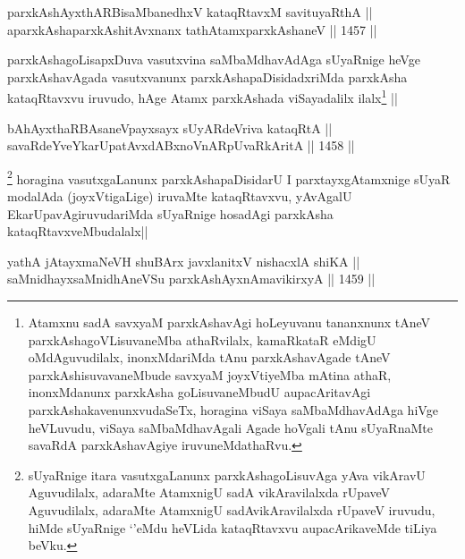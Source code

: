 
\begin{shl}
parxkAshAyxthARBisaMbanedhxV kataqRtavxM savituyaRthA ||  \\
aparxkAshaparxkAshitAvxnanx tathA\s \s tamxparxkAshaneV ||  1457 ||  
\end{shl}

\begin{artha}
parxkAshagoLisapxDuva vasutxvina saMbaMdhavAdAga sUyaRnige heVge parxkAshavAgada vasutxvanunx parxkAshapaDisidadxriMda parxkAsha kataqRtavxvu iruvudo, hAge Atamx parxkAshada viSayadalilx ilalx\footnote{Atamxnu sadA savxyaM parxkAshavAgi hoLeyuvanu tananxnunx tAneV parxkAshagoVLisuvaneMba athaRvilalx, kamaRkataR eMdigU oMdAguvudilalx, inonxMdariMda tAnu parxkAshavAgade tAneV parxkAshisuvavaneMbude savxyaM joyxVtiyeMba mAtina athaR, inonxMdanunx parxkAsha goLisuvaneMbudU aupacAritavAgi parxkAshakavenunxvudaSeTx, horagina viSaya saMbaMdhavAdAga hiVge heVLuvudu, viSaya saMbaMdhavAgali Agade hoVgali tAnu sUyaRnaMte savaRdA parxkAshavAgiye iruvuneMdathaRvu.} ||
\end{artha}

\begin{shl}
bAhAyxthaRBAsaneV\s payxsayx sUyARdeVriva kataqRtA || \\
savaRdeYveYkarUpatAvxdABxnoVnARpUvaRkAritA ||  1458 ||  
\end{shl}

\begin{artha}
\footnote{sUyaRnige itara vasutxgaLanunx parxkAshagoLisuvAga yAva vikAravU Aguvudilalx, adaraMte AtamxnigU sadA vikAravilalxda rUpaveV Aguvudilalx, adaraMte AtamxnigU sadAvikAravilalxda rUpaveV iruvudu, hiMde sUyaRnige `\stext'eMdu heVLida kataqRtavxvu aupacArikaveMde tiLiya beVku.}
horagina vasutxgaLanunx parxkAshapaDisidarU I parxtayxgAtamxnige sUyaR modalAda (joyxVtigaLige) iruvaMte kataqRtavxvu, yAvAgalU EkarUpavAgiruvudariMda sUyaRnige hosadAgi parxkAsha kataqRtavxveMbudalalx||
\end{artha}


\begin{shl}
yathA jAtayxmaNeVH shuBArx javxlanitxV nishacxlA shiKA || \\
saMnidhayxsaMnidhAneVSu parxkAshAyxnAmavikirxyA ||  1459 ||  
\end{shl}

